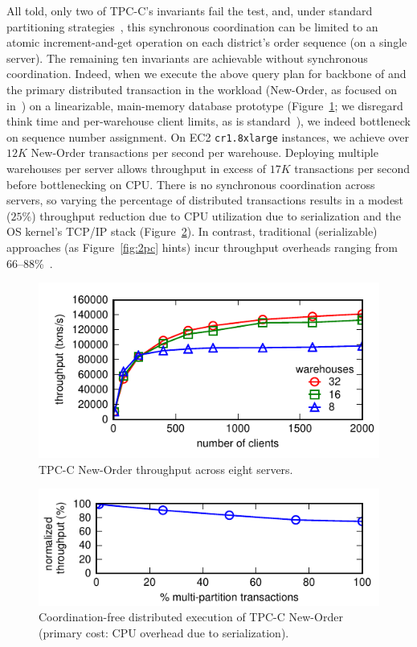 All told, only two of TPC-C's invariants fail the \iconfluence test,
and, under standard partitioning strategies~\cite{calvin,schism}, this
synchronous coordination can be limited to an atomic increment-and-get
operation on each district's order sequence (on a single server). The
remaining ten invariants are achievable without synchronous
coordination. Indeed, when we execute the above query plan for
backbone of and the primary distributed transaction in the workload
(New-Order, as focused on in~\cite{calvin}) on a linearizable,
main-memory database prototype (Figure~\ref{fig:clients}; we disregard
think time and per-warehouse client limits, as is
standard~\cite{calvin,hstore,abadi-vll,jones-dtxn}), we indeed
bottleneck on sequence number assignment. On EC2 \texttt{cr1.8xlarge}
instances, we achieve over $12K$ New-Order transactions per second per
warehouse. Deploying multiple warehouses per server allows throughput
in excess of $17K$ transactions per second before bottlenecking on
CPU. There is no synchronous coordination across servers, so varying
the percentage of distributed transactions results in a modest
($25\%$) throughput reduction due to CPU utilization due to
serialization and the OS kernel's TCP/IP stack
(Figure~\ref{fig:pct}). In contrast, traditional (serializable)
approaches (as Figure~\ref{fig:2pc} hints) incur throughput overheads
ranging from 66--88\%~\cite{abadi-vll}.

\begin{figure}
\includegraphics[width=\columnwidth]{figs/wh_thru.pdf}\vspace{-1em}
\caption{TPC-C New-Order throughput across eight servers.}
\label{fig:clients}
\end{figure}

\begin{figure}
\includegraphics[width=\columnwidth]{figs/pct_thru.pdf}\vspace{-1em}
\caption{Coordination-free distributed execution of TPC-C New-Order
  (primary cost: CPU overhead due to serialization).}
\label{fig:pct}
\end{figure}

